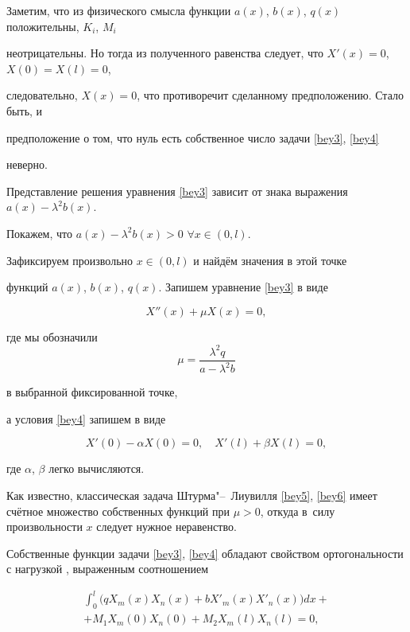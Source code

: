 Заметим, что из физического смысла функции $a(x)$, $b(x)$, $q(x)$ положительны, $K_i$, $M_i$

неотрицательны. Но тогда из полученного равенства следует, что $X'(x)=0$, $X(0)=X(l)=0$,

следовательно, $X(x)=0$, что противоречит сделанному предположению. Стало быть, и

предположение о том, что  нуль есть собственное число задачи  \eqref{bey3}, \eqref{bey4}

неверно.



Представление решения уравнения  \eqref{bey3} зависит от знака выражения $a(x)-\lambda^2b(x)$.

Покажем, что $a(x)-\lambda^2b(x)>0$ $\forall x\in (0, l)$.

Зафиксируем произвольно $x\in (0,l)$ и найдём значения в этой точке

функций $a(x)$, $b(x)$, $q(x)$. Запишем уравнение \eqref{bey3} в виде

\begin{equation}

\label{bey5}

X''(x)+\mu X(x)=0,

\end{equation}

где мы обозначили $$\mu=\frac{\lambda^2 q}{a-\lambda^2 b}$$

в выбранной фиксированной точке,

а условия \eqref{bey4} запишем в виде

\begin{equation}

\label{bey6}

X'(0)-\alpha X(0)=0, \quad 

X'(l)+\beta X(l)=0,

\end{equation}

где $\alpha$, $\beta$ легко вычисляются.



Как известно, классическая задача Штурма"--~Лиувилля  \eqref{bey5}, \eqref{bey6} имеет счётное множество собственных функций при $\mu >0$, откуда в~силу произвольности $x$ следует нужное неравенство.



Собственные функции задачи \eqref{bey3}, \eqref{bey4} обладают свойством ортогональности с нагрузкой \cite[с.~158]{T-S}, выраженным соотношением

\begin{multline}

\label{bey7}

\int_0^l\bigl(qX_m(x)X_n(x)+bX'_m(x)X'_n(x)\bigr)dx + \\ 

+M_1X_m(0)X_n(0)+M_2X_m(l)X_n(l)=0,

\end{multline}

